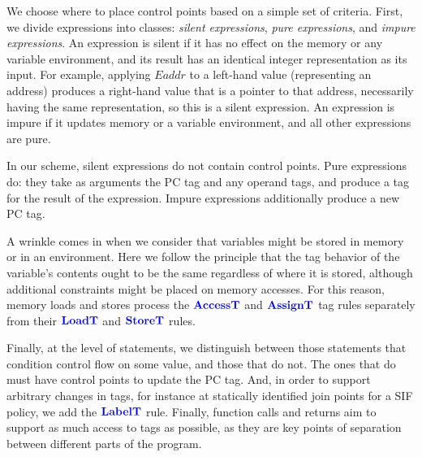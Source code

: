 \documentclass{llncs}
\begin{document}
We choose where to place control points based on a simple set of criteria.
First, we divide expressions into classes: {\em silent expressions},
{\em pure expressions}, and {\em impure expressions}. An expression is
silent if it has no effect on the memory or any variable environment,
and its result has an identical integer representation as its input.
For example, applying \(\mathit{Eaddr}\) to a left-hand value (representing an address)
produces a right-hand value that is a pointer to that address, necessarily having
the same representation, so this is a silent expression. An expression
is impure if it updates memory or a variable environment, and all other expressions are pure.

In our scheme, silent expressions do not contain control points. Pure expressions
do: they take as arguments the PC tag and any operand tags, and produce a tag for the
result of the expression. Impure expressions additionally produce a new PC tag.

A wrinkle comes in when we consider that variables might be stored in memory or in
an environment. 
Here we follow the principle that the tag behavior of the variable's
contents ought to be the same regardless of where it is stored, although additional
constraints might be placed on memory accesses. For this reason, memory loads and stores
process the \(\color{blue} \mathbf{AccessT}\) and \(\color{blue} \mathbf{AssignT}\) tag rules separately from their
\(\color{blue} \mathbf{LoadT}\) and \(\color{blue} \mathbf{StoreT}\) rules.

Finally, at the level of statements, we distinguish between those statements that
condition control flow on some value, and those that do not. The ones that do must
have control points to update the PC tag.
And, in order to support arbitrary changes in tags, for instance at statically identified
join points for a SIF policy, we add the \(\color{blue} \mathbf{LabelT}\) rule.
Finally, function calls and returns aim to support as much access to tags as possible,
as they are key points of separation between different parts of the program.
\end{document}
